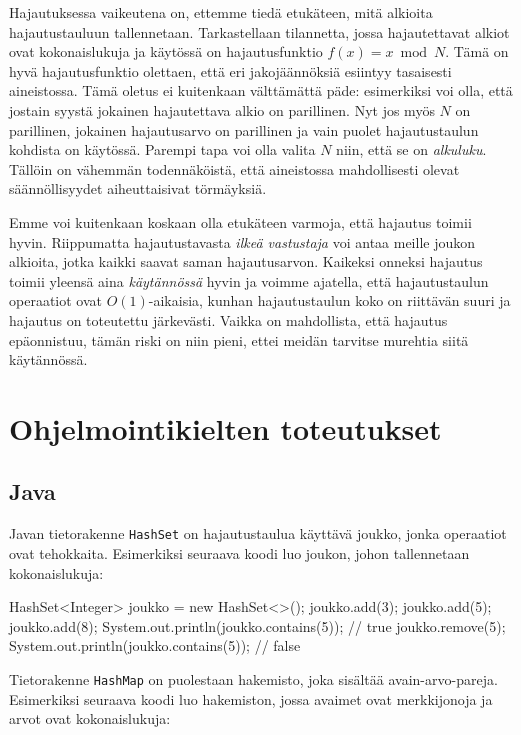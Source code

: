 Hajautuksessa vaikeutena on, ettemme tiedä etukäteen,
mitä alkioita hajautustauluun tallennetaan.
Tarkastellaan tilannetta,
jossa hajautettavat alkiot ovat kokonaislukuja
ja käytössä on hajautusfunktio $f(x) = x \bmod N$.
Tämä on hyvä hajautusfunktio olettaen,
että eri jakojäännöksiä esiintyy tasaisesti aineistossa.
Tämä oletus ei kuitenkaan välttämättä päde:
esimerkiksi voi olla, että jostain syystä
jokainen hajautettava alkio on parillinen.
Nyt jos myös $N$ on parillinen, jokainen hajautusarvo
on parillinen ja vain puolet hajautustaulun kohdista on käytössä.
Parempi tapa voi olla valita $N$ niin, että se on \emph{alkuluku}.
Tällöin on vähemmän todennäköistä,
että aineistossa mahdollisesti olevat säännöllisyydet
aiheuttaisivat törmäyksiä.

Emme voi kuitenkaan koskaan olla etukäteen varmoja,
että hajautus toimii hyvin.
Riippumatta hajautustavasta
\emph{ilkeä vastustaja} voi antaa
meille joukon alkioita, jotka kaikki saavat saman hajautusarvon.
Kaikeksi onneksi hajautus toimii yleensä aina \emph{käytännössä}
hyvin ja voimme ajatella, että hajautustaulun operaatiot ovat
$O(1)$-aikaisia, kunhan hajautustaulun koko on riittävän suuri ja
hajautus on toteutettu järke\-västi.
Vaikka on mahdollista, että hajautus epäonnistuu,
tämän riski on niin pieni, ettei meidän tarvitse murehtia
siitä käytännössä.

\section{Ohjelmointikielten toteutukset}

\subsection{Java}

Javan tietorakenne \texttt{HashSet} on hajautustaulua käyttävä
joukko, jonka operaatiot ovat tehokkaita.
Esimerkiksi seuraava koodi luo joukon, johon tallennetaan
kokonaislukuja:

\begin{code}
HashSet<Integer> joukko = new HashSet<>();
joukko.add(3);
joukko.add(5);
joukko.add(8);
System.out.println(joukko.contains(5)); // true
joukko.remove(5);
System.out.println(joukko.contains(5)); // false
\end{code}

Tietorakenne \texttt{HashMap} on puolestaan hakemisto,
joka sisältää avain-arvo-pareja.
Esimerkiksi seuraava koodi luo hakemiston,
jossa avaimet ovat merkkijonoja ja arvot ovat kokonaislukuja:


